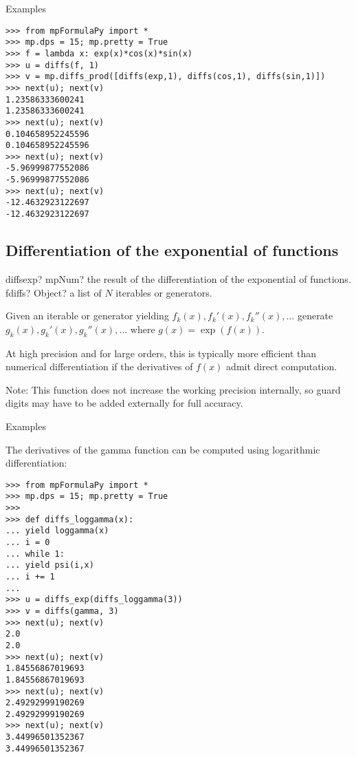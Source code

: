 Examples

\begin{lstlisting}
>>> from mpFormulaPy import *
>>> mp.dps = 15; mp.pretty = True
>>> f = lambda x: exp(x)*cos(x)*sin(x)
>>> u = diffs(f, 1)
>>> v = mp.diffs_prod([diffs(exp,1), diffs(cos,1), diffs(sin,1)])
>>> next(u); next(v)
1.23586333600241
1.23586333600241
>>> next(u); next(v)
0.104658952245596
0.104658952245596
>>> next(u); next(v)
-5.96999877552086
-5.96999877552086
>>> next(u); next(v)
-12.4632923122697
-12.4632923122697
\end{lstlisting}



\subsection{Differentiation of the exponential of functions}

\begin{mpFunctionsExtract}
	\mpFunctionOne
	{diffsexp? mpNum? the result of the differentiation of the exponential of functions.}
	{fdiffs? Object? a list of $N$ iterables or generators.}	
\end{mpFunctionsExtract}


\vpara
Given an iterable or generator yielding $f_k(x),f_k'(x),f_k''(x),\ldots$ generate $g_k(x),g_k'(x),g_k''(x),\ldots$ where $g(x)=\exp(f(x))$.

At high precision and for large orders, this is typically more efficient than numerical differentiation if the derivatives of $f(x)$ admit direct computation.

Note: This function does not increase the working precision internally, so guard digits may have to be added externally for full accuracy.

Examples

The derivatives of the gamma function can be computed using logarithmic
differentiation:

\begin{lstlisting}
>>> from mpFormulaPy import *
>>> mp.dps = 15; mp.pretty = True
>>>
>>> def diffs_loggamma(x):
... yield loggamma(x)
... i = 0
... while 1:
... yield psi(i,x)
... i += 1
...
>>> u = diffs_exp(diffs_loggamma(3))
>>> v = diffs(gamma, 3)
>>> next(u); next(v)
2.0
2.0
>>> next(u); next(v)
1.84556867019693
1.84556867019693
>>> next(u); next(v)
2.49292999190269
2.49292999190269
>>> next(u); next(v)
3.44996501352367
3.44996501352367
\end{lstlisting}



